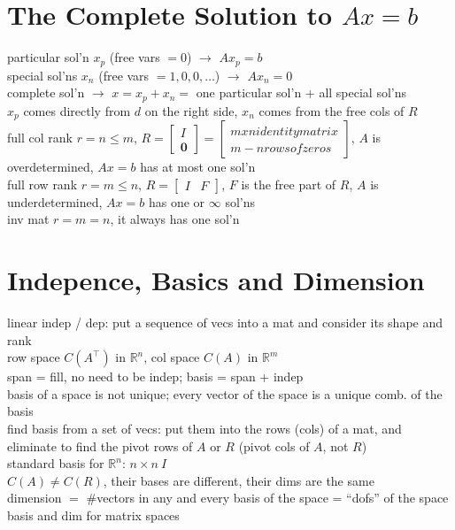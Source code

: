 \documentclass{report}
\begin{document}
\section{The Complete Solution to $Ax = b$}
particular sol'n $x_p$ (free vars $= 0$) $\rightarrow$ $Ax_p = b$ \\
special sol'ns $x_n$ (free vars $= 1, 0, 0, \dots$) $\rightarrow$ $Ax_n = 0$ \\
complete sol'n $\rightarrow$ $x = x_p + x_n = $ one particular sol'n + all special sol'ns \\
$x_p$ comes directly from $d$ on the right side, $x_n$ comes from the free cols of $R$ \\
full col rank $r = n \leq m$, $R = 
\begin{bmatrix}
    I \\
    \mathbf{0}
\end{bmatrix}
= 
\begin{bmatrix}
    m x n identity matrix \\
    m - n rows of zeros 
\end{bmatrix}
$, $A$ is overdetermined, $Ax = b$ has at most one sol'n \\
full row rank $r = m \leq n$, $R = 
\begin{bmatrix}
    I & F
\end{bmatrix}
$, $F$ is the free part of $R$, $A$ is underdetermined, $Ax = b$ has one or $\infty$ sol'ns \\
inv mat $r = m = n$, it always has one sol'n \\

\section{Indepence, Basics and Dimension}
linear indep / dep: put a sequence of vecs into a mat and consider its shape and rank \\ 
row space $C(A^\top)$ in $\mathbb{R}^n$, col space $C(A)$ in $\mathbb{R}^m$ \\
span = fill, no need to be indep; basis = span + indep \\
basis of a space is not unique; every vector of the space is a unique comb. of the basis \\
find basis from a set of vecs: put them into the rows (cols) of a mat, and eliminate to find the pivot 
rows of $A$ or $R$ (pivot cols of $A$, not $R$) \\
standard basis for $\mathbb{R}^n$: $n \times n \ I$ \\
$C(A) \neq C(R)$, their bases are different, their dims are the same \\
dimension $=$ \#vectors in any and every basis of the space = ``dofs'' of the space \\
basis and dim for matrix spaces \\
\end{document}
